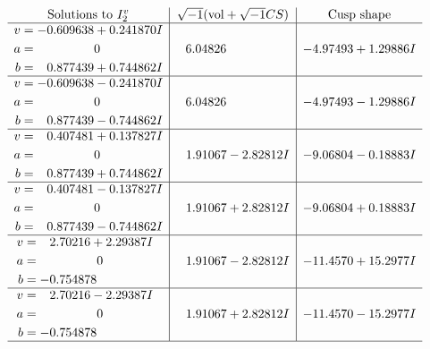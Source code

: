 \documentclass[1p]{elsarticle_modified}
\theoremstyle{definition}
\newcommand{\I}{\sqrt{-1}}
\begin{document}
$$\begin{array}{c|c|c}  
\text{Solutions to }I^v_{2}& \I (\text{vol} + \sqrt{-1}CS) & \text{Cusp shape}\\
 \hline 
\begin{aligned}
v &= -0.609638 + 0.241870 I \\
a &= \phantom{-0.000000 } 0 \\
b &= \phantom{-}0.877439 + 0.744862 I\end{aligned}
 & \phantom{-}6.04826\phantom{ +0.000000I} & -4.97493 + 1.29886 I \\ \hline\begin{aligned}
v &= -0.609638 - 0.241870 I \\
a &= \phantom{-0.000000 } 0 \\
b &= \phantom{-}0.877439 - 0.744862 I\end{aligned}
 & \phantom{-}6.04826\phantom{ +0.000000I} & -4.97493 - 1.29886 I \\ \hline\begin{aligned}
v &= \phantom{-}0.407481 + 0.137827 I \\
a &= \phantom{-0.000000 } 0 \\
b &= \phantom{-}0.877439 + 0.744862 I\end{aligned}
 & \phantom{-}1.91067 - 2.82812 I & -9.06804 - 0.18883 I \\ \hline\begin{aligned}
v &= \phantom{-}0.407481 - 0.137827 I \\
a &= \phantom{-0.000000 } 0 \\
b &= \phantom{-}0.877439 - 0.744862 I\end{aligned}
 & \phantom{-}1.91067 + 2.82812 I & -9.06804 + 0.18883 I \\ \hline\begin{aligned}
v &= \phantom{-}2.70216 + 2.29387 I \\
a &= \phantom{-0.000000 } 0 \\
b &= -0.754878\phantom{ +0.000000I}\end{aligned}
 & \phantom{-}1.91067 - 2.82812 I & -11.4570 + 15.2977 I \\ \hline\begin{aligned}
v &= \phantom{-}2.70216 - 2.29387 I \\
a &= \phantom{-0.000000 } 0 \\
b &= -0.754878\phantom{ +0.000000I}\end{aligned}
 & \phantom{-}1.91067 + 2.82812 I & -11.4570 - 15.2977 I\\
 \hline 
 \end{array}$$\newpage
\end{document}
